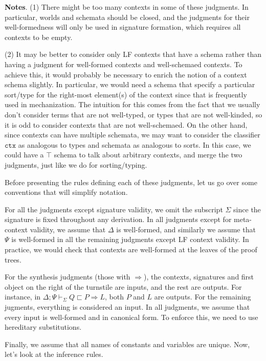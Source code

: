 \documentclass[letterpaper, 11pt]{article}
\newcommand{\Rar}{\Rightarrow}
\begin{document}
    \textbf{Notes}. (1) There might be too many contexts in some of these judgments.  In particular, worlds and schemata should be closed, and the judgments
    for their well-formedness will only be used in signature formation, which requires all contexts to be empty.
    
    (2) It may be better to consider only LF contexts that have a schema rather than having a judgment for well-formed contexts and well-schemaed contexts.
    To achieve this, it would probably be necessary to enrich the notion of a context schema slightly.  In particular, we would need a schema that
    specify a particular sort/type for the right-most element(s) of the context since that is frequently used in mechanization.  The intuition for this
    comes from the fact that we usually don't consider terms that are not well-typed, or types that are not well-kinded, so it is odd to consider
    contexts that are not well-schemaed.  On the other hand, since contexts can have multiple schemata, we may want to consider the classifier 
    $\texttt{ctx}$ as analogous to types and schemata as analogous to sorts.  In this case, we could have a $\top$ schema to talk about arbitrary contexts,
    and merge the two judgments, just like we do for sorting/typing.

    Before presenting the rules defining each of these judgments, let us go over some conventions that will simplify notation.
    
    For all the judgments except signature validity, we omit the subscript $\Sigma$ since the signature is fixed throughout any derivation.
    In all judgments except for meta-context validity, we assume that $\Delta$ is well-formed, and similarly we assume that $\Psi$ is well-formed 
    in all the remaining judgments except LF context validity.  In practice, we would check that contexts are well-formed at the leaves of
    the proof trees.

    For the synthesis judgments (those with $\Rar$), the contexts, signatures and first object on the right of the turnstile
    are inputs, and the rest are outputs.  For instance, in $ \Delta; \Psi \vdash_\Sigma Q \sqsubset P \Rar L$, both $P$ and $L$ are outputs.
    For the remaining jugments, everything is considered an input.  In all judgments, we assume that every input is well-formed and in canonical form.
    To enforce this, we need to use hereditary substitutions.

    Finally, we assume that all names of constants and variables are unique.  Now, let's look at the inference rules.
    
\end{document}
